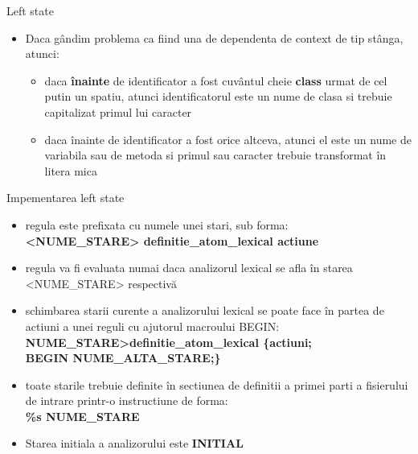 \documentclass[pdf]{beamer}
\begin{document}
\begin{frame}{Left state}
\begin{itemize}
\item
Daca gândim problema ca fiind una de dependenta de context de tip stânga, atunci:

\begin{itemize}
\item
daca \textbf{înainte} de identificator a fost cuvântul cheie \textbf{class} urmat de cel putin un spatiu, atunci identificatorul este un nume de clasa si trebuie capitalizat primul lui caracter
\newline

\item
daca înainte de identificator a fost orice altceva, atunci el este un nume de variabila sau de metoda si primul sau caracter trebuie transformat în litera mica
\end{itemize}

\end{itemize}
\end{frame}



\begin{frame}{Impementarea left state}
\begin{itemize}
\item
regula este prefixata cu numele unei stari, sub forma:
\\
\textbf{<NUME\_STARE> definitie\_atom\_lexical actiune}
\newline

\item
regula va fi evaluata numai daca analizorul lexical se afla în starea <NUME\_STARE> respectivă
\newline

\item
schimbarea starii curente a analizorului lexical se poate face în partea de actiuni a unei reguli cu ajutorul macroului BEGIN:
\\
\textbf{NUME\_STARE>definitie\_atom\_lexical \{actiuni;\\
\hspace{40mm}BEGIN NUME\_ALTA\_STARE;\}}
\newline

\item
toate starile trebuie definite în sectiunea de definitii a primei parti a fisierului de intrare printr-o instructiune de forma:
\\
\hspace{25mm} \textbf{\%s NUME\_STARE}
\newline

\item
Starea initiala a analizorului este \textbf{INITIAL}

\end{itemize}
\end{frame}
\end{document}

